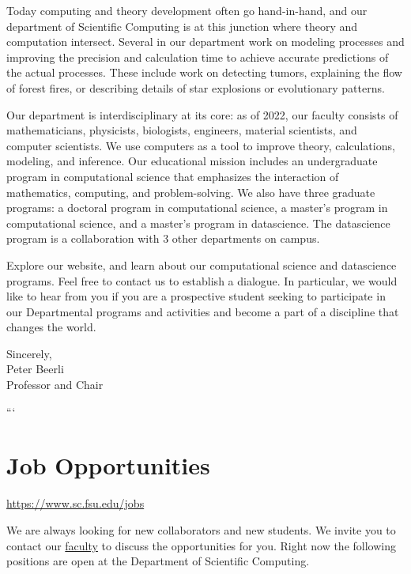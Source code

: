 \documentclass[12pt,a4paper]{article}
\begin{document}
Today computing and theory development often go hand-in-hand, and our department of Scientific Computing is at this junction where theory and computation intersect. Several in our department work on modeling processes and improving the precision and calculation time to achieve accurate predictions of the actual processes. These include work on detecting tumors, explaining the flow of forest fires, or describing details of star explosions or evolutionary patterns.

Our department is interdisciplinary at its core: as of 2022, our faculty consists of mathematicians, physicists, biologists, engineers, material scientists, and computer scientists. We use computers as a tool to improve theory, calculations, modeling, and inference. Our educational mission includes an undergraduate program in computational science that emphasizes the interaction of mathematics, computing, and problem-solving. We also have three graduate programs: a doctoral program in computational science, a master's program in computational science, and a master's program in datascience. The datascience program is a collaboration with 3 other departments on campus.

Explore our website, and learn about our computational science and datascience programs. Feel free to contact us to establish a dialogue. In particular, we would like to hear from you if you are a prospective student seeking to participate in our Departmental programs and activities and become a part of a discipline that changes the world.

\vspace{1em}

\begin{flushright}
    Sincerely, \\
    Peter Beerli \\
    Professor and Chair
\end{flushright}
```

\section{Job Opportunities}
\url{https://www.sc.fsu.edu/jobs}

\vspace{1em}

We are always looking for new collaborators and new students. We invite you to contact our \href{https://www.sc.fsu.edu/people/faculty}{faculty} to discuss the opportunities for you. Right now the following positions are open at the Department of Scientific Computing.
\end{document}
